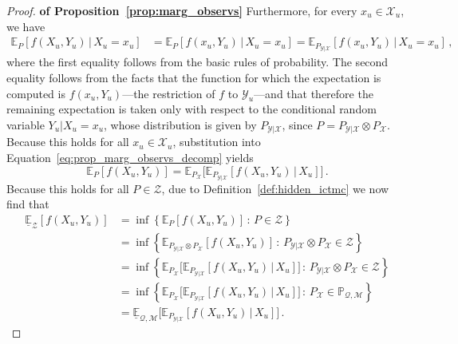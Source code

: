 \documentclass[3p]{elsarticle}
\newcommand{\states}{\mathcal{X}}
\newcommand{\observs}{\mathcal{Y}}
\begin{document}
\begin{proof}{\bf of Proposition~\ref{prop:marg_observs}}
Furthermore, for every $x_u\in\states_u$, we have
\begin{align*}
\mathbb{E}_P[f(X_u,Y_u)\,\vert\,X_u=x_u] &= \mathbb{E}_P[f(x_u,Y_u)\,\vert\,X_u=x_u] = \mathbb{E}_{P_{\observs\vert\states}}[f(x_u,Y_u)\,\vert\,X_u=x_u]\,,
\end{align*}
where the first equality follows from the basic rules of probability. The second equality follows from the facts that the function for which the expectation is computed is $f(x_u,Y_u)$---the restriction of $f$ to $\observs_u$---and that therefore the remaining expectation is taken only with respect to the conditional random variable $Y_u\vert X_u=x_u$, whose distribution is given by $P_{\observs\vert\states}$, since $P=P_{\observs\vert\states}\otimes P_\states$. Because this holds for all $x_u\in\states_u$, substitution into Equation~\eqref{eq:prop_marg_observs_decomp} yields
\begin{equation*}
\mathbb{E}_P[f(X_u,Y_u)] = \mathbb{E}_{P_\states}\bigl[ \mathbb{E}_{P_{\observs\vert\states}}[f(X_u,Y_u)\,\vert\,X_u] \bigr]\,.
\end{equation*}
Because this holds for all $P\in\mathcal{Z}$, due to Definition~\ref{def:hidden_ictmc} we now find that
\begin{align*}
\underline{\mathbb{E}}_{\mathcal{Z}}[f(X_u,Y_u)] &= \inf\left\{ \mathbb{E}_P[f(X_u,Y_u)]\,:\, P\in\mathcal{Z}\right\} \\
 &= \inf\left\{ \mathbb{E}_{P_{\observs\vert\states}\otimes P_\states}[f(X_u,Y_u)]\,:\, P_{\observs\vert\states}\otimes P_\states\in\mathcal{Z}\right\} \\
 &= \inf\left\{ \mathbb{E}_{P_\states}\bigl[ \mathbb{E}_{P_{\observs\vert\states}}[f(X_u,Y_u)\,\vert\,X_u] \bigr] \,:\, P_{\observs\vert\states}\otimes P_\states\in\mathcal{Z}\right\} \\
 &= \inf\left\{ \mathbb{E}_{P_\states}\bigl[ \mathbb{E}_{P_{\observs\vert\states}}[f(X_u,Y_u)\,\vert\,X_u] \bigr] \,:\,  P_\states\in\mathbb{P}_{\mathcal{Q},\mathcal{M}}\right\} \\
 &= \underline{\mathbb{E}}_{\mathcal{Q},\mathcal{M}}\bigl[ \mathbb{E}_{P_{\observs\vert\states}}[f(X_u,Y_u)\,\vert\,X_u] \bigr]\,.
\end{align*} 
\end{proof}
\end{document}
